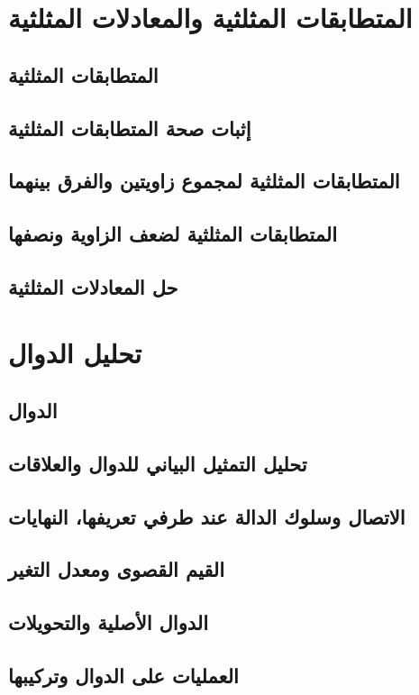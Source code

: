 \documentclass[a4paper, 12pt]{article}
\begin{document}
    \tableofcontents
    \section{المتطابقات المثلثية والمعادلات المثلثية}
        \subsection{المتطابقات المثلثية}
        \subsection{إثبات صحة المتطابقات المثلثية}
        \subsection{المتطابقات المثلثية لمجموع زاويتين والفرق بينهما}
        \subsection{المتطابقات المثلثية لضعف الزاوية ونصفها}
        \subsection{حل المعادلات المثلثية}
    \section{تحليل الدوال}
        \subsection{الدوال}
        \subsection{تحليل التمثيل البياني للدوال والعلاقات}
        \subsection{الاتصال وسلوك الدالة عند طرفي تعريفها، النهايات}
        \subsection{القيم القصوى ومعدل التغير}
        \subsection{الدوال الأصلية والتحويلات}
        \subsection{العمليات على الدوال وتركيبها}
\end{document}
